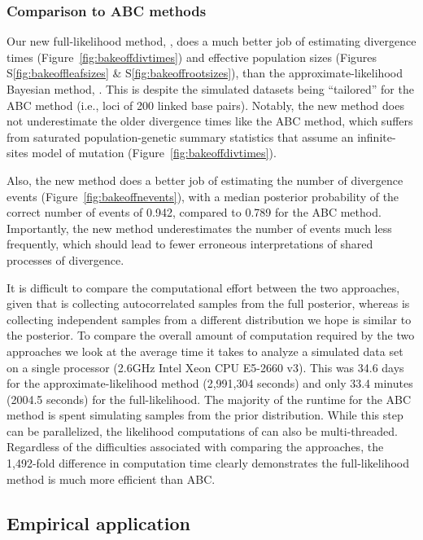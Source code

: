 \subsubsection{Comparison to ABC methods}

Our new full-likelihood method, \ecoevolity, does a much better job of
estimating divergence times
(Figure~\ref{fig:bakeoffdivtimes})
and effective population sizes
(Figures
S\ref{fig:bakeoffleafsizes}
\&
S\ref{fig:bakeoffrootsizes}),
than the approximate-likelihood Bayesian method, \dppmsbayes.
This is despite the simulated datasets being ``tailored'' for the ABC method
(i.e., loci of 200 linked base pairs).
Notably, the new method does not underestimate the older divergence times like
the ABC method, which suffers from saturated population-genetic summary
statistics that assume an infinite-sites model of mutation
(Figure~\ref{fig:bakeoffdivtimes}).

Also, the new method does a better job of estimating the number of divergence
events (Figure~\ref{fig:bakeoffnevents}), with a median posterior probability
of the correct number of events of 0.942, compared to 0.789 for the ABC method.
Importantly, the new method underestimates the number of events much less
frequently,
which should lead to fewer erroneous interpretations of shared processes of
divergence.

It is difficult to compare the computational effort between the two approaches,
given that \ecoevolity is collecting autocorrelated samples from
the full posterior, whereas \dppmsbayes is collecting independent samples
from a different distribution we hope is similar to the posterior.
To compare the overall amount of computation required by the two approaches
we look at the average time it takes to analyze a simulated data set
on a single processor 
(2.6GHz Intel Xeon CPU E5-2660 v3).
This was 34.6 days for the approximate-likelihood method (2,991,304 seconds)
and only 33.4 minutes (2004.5 seconds) for the full-likelihood.
The majority of the runtime for the ABC method is spent simulating samples
from the prior distribution.
While this step can be parallelized, the likelihood computations of \ecoevolity
can also be multi-threaded.
Regardless of the difficulties associated with comparing the approaches, the
1,492-fold difference in computation time clearly demonstrates the
full-likelihood method is much more efficient than ABC.


\subsection{Empirical application}

